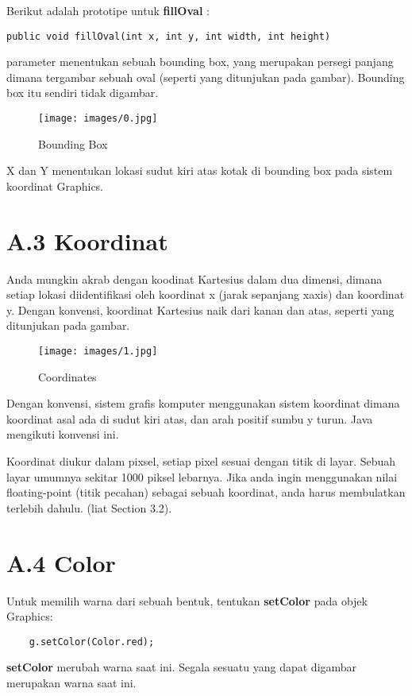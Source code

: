 Berikut adalah prototipe untuk \textbf{fillOval} :
\begin{lstlisting}
public void fillOval(int x, int y, int width, int height)
\end{lstlisting}
parameter menentukan sebuah bounding box, yang merupakan persegi panjang dimana tergambar sebuah oval (seperti yang ditunjukan pada gambar). Bounding box itu sendiri tidak digambar.
\begin{figure}[H]
	\centering \texttt{[image: images/0.jpg]}
	\caption{Bounding Box}
	\label{fig:binaryTreeRekursif}
\end{figure}
X dan Y menentukan lokasi sudut kiri atas kotak di bounding box pada sistem koordinat Graphics.

\section{A.3 Koordinat}
Anda mungkin akrab dengan koodinat Kartesius dalam dua dimensi, dimana setiap lokasi diidentifikasi oleh koordinat x (jarak sepanjang xaxis) dan koordinat y. Dengan konvensi, koordinat Kartesius naik dari kanan dan atas, seperti yang ditunjukan pada gambar.
\begin{figure}[H]
	\centering \texttt{[image: images/1.jpg]}
	\caption{Coordinates}
	\label{fig:binaryTreeRekursif}
\end{figure}

Dengan konvensi, sistem grafis komputer menggunakan sistem koordinat dimana koordinat asal ada di sudut kiri atas, dan arah positif sumbu y turun. Java mengikuti konvensi ini.

Koordinat diukur dalam pixsel, setiap pixel sesuai dengan titik di layar. Sebuah layar umumnya sekitar 1000 piksel lebarnya. Jika anda ingin menggunakan nilai floating-point (titik pecahan) sebagai sebuah koordinat, anda harus membulatkan terlebih dahulu. (liat Section 3.2).

\section{A.4 Color}
Untuk memilih warna dari sebuah bentuk,  tentukan \textbf{setColor} pada objek Graphics:

\begin{lstlisting}
	g.setColor(Color.red);
\end{lstlisting}

\textbf{setColor} merubah warna saat ini. Segala sesuatu yang dapat digambar merupakan warna saat ini.

